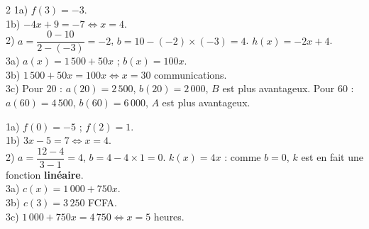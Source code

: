 \begin{multicols}{2}
1a) $f(3)=-3$.\\
1b) $-4x+9=-7\iff x=4$.\\
2) $a=\dfrac{0-10}{2-(-3)}=-2$, $b=10-(-2)\times(-3)=4$. $h(x)=-2x+4$.\\
3a) $a(x)=1\,500+50x$ ; $b(x)=100x$.\\
3b) $1\,500+50x=100x\iff x=30$ communications.\\
3c) Pour $20$ : $a(20)=2\,500$, $b(20)=2\,000$, $B$ est plus avantageux. Pour $60$ :
$a(60)=4\,500$, $b(60)=6\,000$, $A$ est plus avantageux.

1a) $f(0)=-5$ ; $f(2)=1$.\\
1b) $3x-5=7\iff x=4$.\\
2) $a=\dfrac{12-4}{3-1}=4$, $b=4-4\times1=0$. $k(x)=4x$ : comme $b=0$, $k$ est en fait une
fonction \textbf{linéaire}.\\
3a) $c(x)=1\,000+750x$.\\
3b) $c(3)=3\,250$ FCFA.\\
3c) $1\,000+750x=4\,750\iff x=5$ heures.

\end{multicols}
\exercicesBanner
